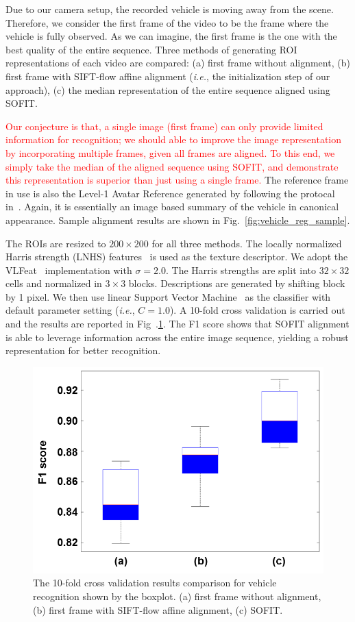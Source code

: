 \documentclass[10pt,journal]{IEEEtran}
\newcommand{\Songfan}[1]{\textcolor{red}{#1}}
\begin{document}
Due to our camera setup, the recorded vehicle is moving away from the scene. Therefore, we consider the first frame of the video to be the frame where the vehicle is fully observed. As we can imagine, the first frame is the one with the best quality of the entire sequence. Three methods of generating ROI representations of each video are compared: (a) first frame without alignment, (b) first frame with SIFT-flow affine alignment (\textit{i.e.}, the initialization step of our approach), (c) the median representation of the entire sequence aligned using SOFIT. 

\Songfan{Our conjecture is that, a single image (first frame) can only provide limited information for recognition; we should able to improve the image representation by incorporating multiple frames, given all frames are aligned. To this end, we simply take the median of the aligned sequence using SOFIT, and demonstrate this representation is superior than just using a single frame.} The reference frame in use is also the Level-1 Avatar Reference generated by following the protocal in~\cite{Yang_SMCB12}. Again, it is essentially an image based summary of the vehicle in canonical appearance. Sample alignment results are shown in Fig.~\ref{fig:vehicle_reg_sample}.

The ROIs are resized to $200\times200$ for all three methods. The locally normalized Harris strength (LNHS) features~\cite{Pearce11} is used as the texture descriptor. We adopt the VLFeat~\cite{vlfeat} implementation with $\sigma=2.0$. The Harris strengths are split into $32\times32$ cells and normalized in $3\times3$ blocks. Descriptions are generated by shifting block by 1 pixel. We then use linear Support Vector Machine~\cite{sklearn} as the classifier with default parameter setting (\textit{i.e.}, $C=1.0$). A 10-fold cross validation is carried out and the results are reported in Fig~.\ref{fig:fig_vehicle_cls_f1}. The F1 score shows that SOFIT alignment is able to leverage information across the entire image sequence, yielding a robust representation for better recognition. 

\begin{figure}[htbp]
	\centering
		\includegraphics[width=.6\columnwidth]{fig/vehicle_cls_f1.png}
	\caption{The 10-fold cross validation results comparison for vehicle recognition shown by the boxplot. (a) first frame without alignment, (b) first frame with SIFT-flow affine alignment, (c) SOFIT.}
	\label{fig:fig_vehicle_cls_f1}
\end{figure}
\end{document}
